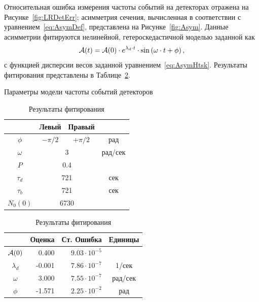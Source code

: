 \documentclass{report}
\newcommand{\vp}[2]{{#1}\cdot 10^{#2}}
\newcommand{\LTb}{\tau_b}
\newcommand{\LTd}{\tau_d}
\newcommand{\lamd}{\lambda_d}
\begin{document}
Относительная ошибка измерения частоты событий на детекторах отражена на
Рисунке~\ref{fig:LRDetErr}; асимметрия сечения, вычисленная в
соответствии с уравнением~\eqref{eq:AsymDef}, представлена на Рисунке~\ref{fig:Asym}.
Данные асимметрии фитируются нелинейной, гетероскедастичной моделью
заданной как
\[
\Asym(t) = \Asym(0)\cdot e^{\lamd\cdot t}\cdot\sin\bkt{\omega\cdot t + \phi},
\]
с функцией дисперсии весов заданной
уравнением~\eqref{eq:AsymHtsk}. Результаты фитирования представлены в Таблице~\ref{tbl:FitRes}.
\begin{table}[h]
  \begin{minipage}[t]{.5\linewidth}
    \centering
    \caption{Параметры модели частоты событий детекторов\label{tbl:DetCntRtParam}}
    \begin{tabular}[t]{cccc}
      \hline
      &   Левый   &     Правый     &  \\ \hline
      $\phi$  & $-\pi/2$ &   $+\pi/2$    &   рад   \\
      $\omega$ &  \multicolumn{2}{c}{3}   & рад/сек \\
      $P$    & \multicolumn{2}{c}{0.4}  &  \\
      $\LTd$  & \multicolumn{2}{c}{721}  &   сек   \\
      $\LTb$  & \multicolumn{2}{c}{721}  &   сек   \\
      $N_0(0)$ & \multicolumn{2}{c}{6730} &  \\ \hline
    \end{tabular}
  \end{minipage}%
  \begin{minipage}[t]{.5\linewidth}
    \centering
    \caption{Результаты фитирования\label{tbl:FitRes}}
    \begin{tabular}[t]{crrc}
      \hline
      & Оценка &             Ст. Ошибка &  Единицы   \\ \hline
      $\mathcal{A}(0)$ &   0.400 & $\vp{9.03}{-5}$ &         \\
      $\lamd$   &  -0.001 & $\vp{7.86}{-7}$ &  1/сек  \\
      $\omega$  &   3.000 & $\vp{7.55}{-7}$ & рад/сек \\
      $\phi$   &  -1.571 & $\vp{2.25}{-2}$ &   рад   \\ \hline
    \end{tabular}
  \end{minipage}
\end{table}
\end{document}

